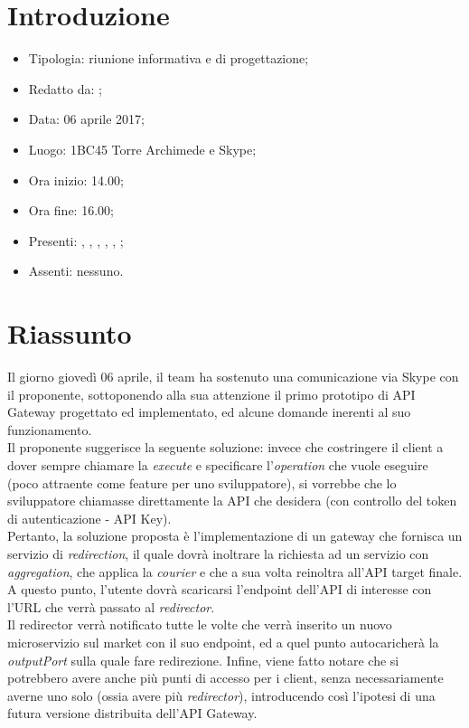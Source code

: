 \section{Introduzione}

	\begin{itemize}
		\item Tipologia: riunione informativa e di progettazione;
		\item Redatto da: \DAN;
		\item Data: 06 aprile 2017;
		\item Luogo: 1BC45 Torre Archimede e Skype;
		\item Ora inizio: 14.00;
		\item Ora fine: 16.00;
		\item Presenti: \DS, \AN, \DAN, \MC, \NS, \AS;	
		\item Assenti: nessuno.
	\end{itemize}

\section{Riassunto}
Il giorno giovedì 06 aprile, il team ha sostenuto una comunicazione via Skype con il proponente, sottoponendo alla sua attenzione il primo prototipo di API Gateway progettato ed implementato, ed alcune domande inerenti al suo funzionamento.\\
Il proponente suggerisce la seguente soluzione: invece che costringere il client a dover sempre chiamare la \textit{execute} e specificare l'\textit{operation} che vuole eseguire (poco attraente come feature per uno sviluppatore), si vorrebbe che lo sviluppatore chiamasse direttamente la API che desidera (con controllo del token di autenticazione - API Key).\\
Pertanto, la soluzione proposta è l'implementazione di un gateway che fornisca un servizio di \textit{redirection}, il quale dovrà inoltrare la richiesta ad un servizio con \textit{aggregation}, che applica la \textit{courier} e che a sua volta reinoltra all'API target finale.
A questo punto, l'utente dovrà scaricarsi l'endpoint dell'API di interesse con l'URL che verrà passato al \textit{redirector}.\\
Il redirector verrà notificato tutte le volte che verrà inserito un nuovo microservizio sul market con il suo endpoint, ed a quel punto autocaricherà la \textit{outputPort} sulla quale fare redirezione.
Infine, viene fatto notare che si potrebbero avere anche più punti di accesso per i client, senza necessariamente averne uno solo (ossia avere più \textit{redirector}), introducendo così l'ipotesi di una futura versione distribuita dell'API Gateway.

